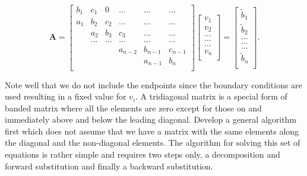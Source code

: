\documentclass[%
oneside,                 %
final,                   %
10pt]{article}
\begin{document}
\[
    \mathbf{A} = \begin{bmatrix}
                           b_1& c_1 & 0 &\dots   & \dots &\dots \\
                           a_1 & b_2 & c_2 &\dots &\dots &\dots \\
                           & a_2 & b_3 & c_3 & \dots & \dots \\
                           & \dots   & \dots &\dots   &\dots & \dots \\
                           &   &  &a_{n-2}  &b_{n-1}& c_{n-1} \\
                           &    &  &   &a_{n-1} & b_n \\
                      \end{bmatrix}\begin{bmatrix}
                           v_1\\
                           v_2\\
                           \dots \\
                          \dots  \\
                          \dots \\
                           v_n\\
                      \end{bmatrix}
  =\begin{bmatrix}
                           \tilde{b}_1\\
                           \tilde{b}_2\\
                           \dots \\
                           \dots \\
                          \dots \\
                           \tilde{b}_n\\
                      \end{bmatrix}.
\]




Note well that we do not include the endpoints since the boundary
conditions are used resulting in a fixed value for $v_i$.  A
tridiagonal matrix is a special form of banded matrix where all the
elements are zero except for those on and immediately above and below
the leading diagonal.  Develop a general algorithm first which does
not assume that we have a matrix with the same elements along the
diagonal and the non-diagonal elements.  The algorithm for solving
this set of equations is rather simple and requires two steps only, a
decomposition and forward substitution and finally a backward
substitution.
\end{document}
